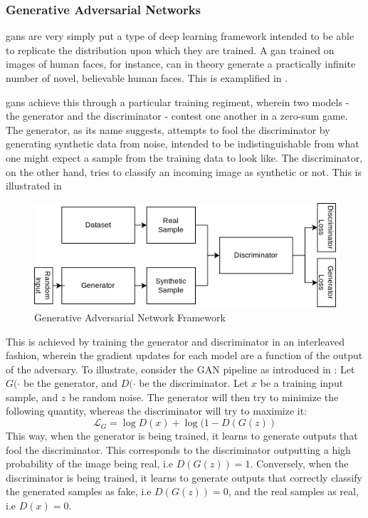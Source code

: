     \subsubsection{Generative Adversarial Networks}
     \glspl{gan} are very simply put a type of deep learning framework intended to be able to replicate the distribution upon which they are trained. A \gls{gan} trained on images of human faces, for instance, can in theory generate a practically infinite number of novel, believable human faces. This is examplified in \cite{facegan}. 
     
     \glspl{gan} achieve this through a particular training regiment, wherein two models - the generator and the discriminator - contest one another in a zero-sum game. The generator, as its name suggests, attempts to fool the discriminator by generating synthetic data from noise, intended to be indistinguishable from what one might expect a sample from the training data to look like. The discriminator, on the other hand, tries to classify an incoming image as synthetic or not. This is illustrated in  
     \begin{figure}
         \centering
         \includegraphics[width=\linewidth]{illustrations/gan.png}
         \caption{Generative Adversarial Network Framework}
         \label{fig:gan}
     \end{figure}
     
     This is achieved by training the generator and discriminator in an interleaved fashion, wherein the gradient updates for each model are a function of the output of the adversary. To illustrate, consider the GAN pipeline as introduced in \cite{gan_first}:
     Let \(G(\cdot\) be the generator, and \(D(\cdot\) be the discriminator. Let \(x\) be a training input sample, and \(z\) be random noise. The generator will then try to minimize the following quantity, whereas the discriminator will try to maximize it:
     \begin{equation}\label{gan_loss}
        \mathcal{L}_G = \log{D(x)} + \log{(1-D(G(z))} 
     \end{equation}
     This way, when the generator is being trained, it learns to generate outputs that fool the discriminator. This corresponds to the discriminator outputting a high probability of the image being real, i.e \(D(G(z)) = 1\). Conversely, when the discriminator is being trained, it learns to generate outputs that correctly classify the generated samples as fake, i.e \(D(G(z)) = 0\), and the real samples as real, i.e \(D(x) = 0\). 
     
